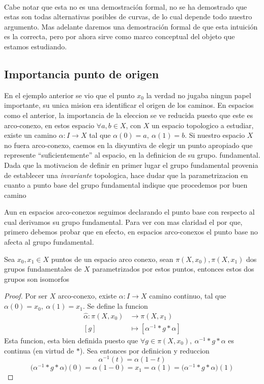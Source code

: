 {\paragraph{} Cabe notar que esta no es una demostración formal, no se ha demostrado
que estas son todas alternativas posibles de curvas, de lo cual depende
todo nuestro argumento. Mas adelante daremos una demostración formal de
que esta intuición es la correcta, pero por ahora sirve como marco
conceptual del objeto que estamos estudiando.

\subsection{Importancia punto de origen}
En el ejemplo anterior se vio que el punto \(x_0\) la verdad no
jugaba ningun papel importante, su unica mision era identificar el
origen de los caminos. En espacios como el anterior, la importancia de
la eleccion se ve reducida puesto que este es arco-conexo, en estos
espacio \(\forall a,b \in X\), con \(X\) un espacio topologico a
estudiar, existe un camino \(\alpha : I \to X\) tal que \(\alpha (0) =
a,\ \alpha (1) = b\). Si nuestro espacio \(X\) no fuera arco-conexo,
caemos en la disyuntiva de elegir un punto apropiado que represente
``suficientemente'' al espacio, en la definicion de su grupo.
fundamental. Dada que la motivacion de definir en primer lugar el grupo
fundamental provenia de establecer una \emph{invariante} topologica,
hace dudar que la parametrizacion en cuanto a punto base del grupo
fundamental indique que procedemos por buen camino

Aun en espacios arco-conexos seguimos declarando el punto base con
respecto al cual derivamos su grupo fundamental. Para ver con mas
claridad el por que, primero debemos probar que en efecto, en espacios
arco-conexos el punto base no afecta al grupo fundamental.
\begin{teorema} \label{not:alpha-hat}
  Sea \(x_0 , x_1 \in X\) puntos de un espacio arco conexo, sean \(\pi
  (X, x_0), \pi (X, x_1)\) dos grupos fundamentales de \(X\)
  parametrizados por estos puntos, entonces estos dos grupos son isomorfos
\end{teorema}
\begin{proof}
  Por ser \(X\) arco-conexo, existe \(\alpha : I \to X\) camino
  continuo, tal que \(\alpha (0) = x_0,\ \alpha (1) = x_1\). Se define
  la funcion
  \begin{align*}
    \hat \alpha : \pi (X, x_0) &\to \pi (X, x_1) \\
    [g] &\mapsto [ \alpha^{-1} * g * \alpha ]
  \end{align*}
  Esta funcion, esta bien definida puesto que \(\forall g \in \pi (X,
  x_0),\ \alpha^{-1} * g * \alpha \) es continua (en virtud de \(*\)).
  Sea entonces por definicion y reduccion
  \[ \alpha^{-1} (t) = \alpha (1 - t)\]
  \[\big(\alpha^{-1} * g * \alpha \big) (0) = \alpha (1 - 0) = x_1 = \alpha (1) =
    \big(\alpha^{-1} * g * \alpha \big) (1)\]


\end{proof}}
